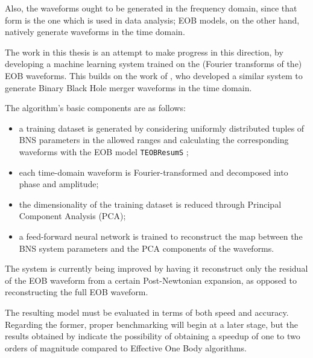 \documentclass[11pt]{article}
\begin{document}
Also, the waveforms ought to be generated in the frequency domain, since that form is the one which is used in data analysis;
EOB models, on the other hand, natively generate waveforms in the time domain. 

The work in this thesis is an attempt to make progress in this direction, by developing a machine learning system trained on the (Fourier transforms of the) EOB waveforms. 
This builds on the work of \textcite{schmidtMachineLearningGravitational2020}, who developed a similar system to generate Binary Black Hole merger waveforms in the time domain.

The algorithm's basic components are as follows:
\begin{itemize}
    \item a training dataset is generated by considering uniformly distributed tuples of BNS parameters in the allowed ranges and calculating the corresponding waveforms with the EOB model \texttt{TEOBResumS} \cite[]{nagarTimedomainEffectiveonebodyGravitational2018};
    \item each time-domain waveform is Fourier-transformed and decomposed into phase and amplitude;
    \item the dimensionality of the training dataset is reduced through Principal Component Analysis (PCA);
    \item a feed-forward neural network is trained to reconstruct the map between the BNS system parameters and the PCA components of the waveforms. 
\end{itemize}

The system is currently being improved by having it reconstruct only the residual of the EOB waveform from a certain Post-Newtonian expansion, as opposed to reconstructing the full EOB waveform. 

The resulting model must be evaluated in terms of both speed and accuracy.
Regarding the former, proper benchmarking will begin at a later stage, but the results obtained by \textcite[]{schmidtMachineLearningGravitational2020} indicate the possibility of obtaining a speedup of one to two orders of magnitude compared to Effective One Body algorithms. 
\end{document}
